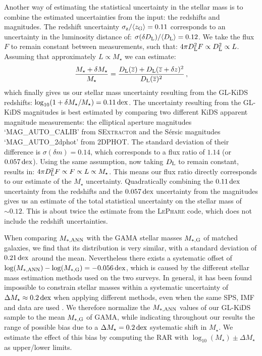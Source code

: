 \documentclass[usenatbib]{mnras}
\newcommand*{\meanl}[1]{\overline{#1}}
\newcommand*{\meanb}[1]{\langle{#1}\rangle}
\newcommand{\un}[1]{_{\rm #1}}
\newcommand{\dex}{\, {\rm dex}}
\begin{document}
Another way of estimating the statistical uncertainty in the stellar mass is to combine the estimated uncertainties from the input: the redshifts and magnitudes. The redshift uncertainty $\sigma\un{z}/\meanb{z\un{G}} = 0.11$ corresponds to an uncertainty in the luminosity distance of: $\sigma(\delta D\un{L})/\meanb{D\un{L}} = 0.12$. We take the flux $F$ to remain constant between measurements, such that: $4 \pi D\un{L}^2 F \propto D\un{L}^2 \propto L$. Assuming that approximately $L \propto M_\star$ we can estimate: 
\begin{equation}
\frac{M_\star + \delta M_\star}{M_\star} = \frac{D\un{L}(\meanl{z}) + D\un{L}(\meanl{z}+\delta z)^2}{D\un{L}(\meanl{z})^2} \, ,
\end{equation}
which finally gives us our stellar mass uncertainty resulting from the GL-KiDS redshifts: $\log_{10}(1+\delta M_\star/M_\star) = 0.11 \dex$. The uncertainty resulting from the GL-KiDS magnitudes is best estimated by comparing two different KiDS apparent magnitude measurements: the elliptical aperture magnitudes `MAG\_AUTO\_CALIB' from \textsc{SExtractor} and the S\'ersic magnitudes `MAG\_AUTO\_2dphot' from \textsc{2DPHOT}. The standard deviation of their difference is $\sigma(\delta m) = 0.14$, which corresponds to a flux ratio of $1.14$ (or $0.057 \dex$). Using the same assumption, now taking $D\un{L}$ to remain constant, results in: $4 \pi D\un{L}^2 F \propto F \propto L \propto M_\star$. This means our flux ratio directly corresponds to our estimate of the $M_\star$ uncertainty. Quadratically combining the $0.11 \dex$ uncertainty from the redshifts and the $0.057 \dex$ uncertainty from the magnitudes gives us an estimate of the total statistical uncertainty on the stellar mass of $\sim0.12$. This is about twice the estimate from the \textsc{LePhare} code, which does not include the redshift uncertainties.

When comparing $M\un{*,ANN}$ with the GAMA stellar masses $M\un{*,G}$ of matched galaxies, we find that its distribution is very similar, with a standard deviation of $0.21 \dex$ around the mean. Nevertheless there exists a systematic offset of $\log(M\un{*,ANN}) - \log(M\un{*,G}) = -0.056 \dex$, which is caused by the different stellar mass estimation methods used on the two surveys. In general, it has been found impossible to constrain stellar masses within a systematic uncertainty of $\Delta M_\star \approx 0.2 \dex$ when applying different methods, even when the same SPS, IMF and data are used \cite[]{taylor2011,wright2017}. We therefore normalize the $M\un{*,ANN}$ values of our GL-KiDS sample to the mean $M\un{*,G}$ of GAMA, while indicating throughout our results the range of possible bias due to a $\Delta M_\star = 0.2 \dex$ systematic shift in $M_\star$. We estimate the effect of this bias by computing the RAR with $\log_{10}(M_\star)\pm\Delta M_\star$ as upper/lower limits.
\end{document}
